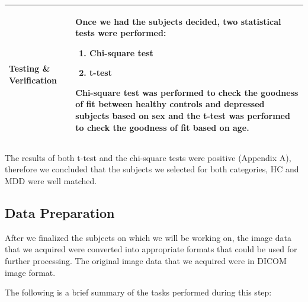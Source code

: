 \documentclass[12pt]{article}
\begin{document}
\begin{table}[H]
\begin{tabular} {| m{3.3cm} | m{11.5cm} | }
    Testing \& Verification &
    Once we had the subjects decided, two statistical tests were
    performed:
    \begin{enumerate}[noitemsep]
      \item Chi-square test
      \item t-test
    \end{enumerate}

    Chi-square test was performed to check the goodness of fit between
    healthy controls and depressed subjects based on sex and the
    t-test was performed to check the goodness of fit based on age. \\ \hline
  \end{tabular}
\end{table}

The results of both t-test and the chi-square tests were positive
(Appendix A), therefore we concluded that the subjects we selected for
both categories, HC and MDD were well matched.

\newpage
\subsection{Data Preparation}%

After we finalized the subjects on which we will be working on, the
image data that we acquired were converted into appropriate formats
that could be used for further processing. The original image data
that we acquired were in DICOM image format.

The following is a brief summary of the tasks performed during this
step:
\end{document}
